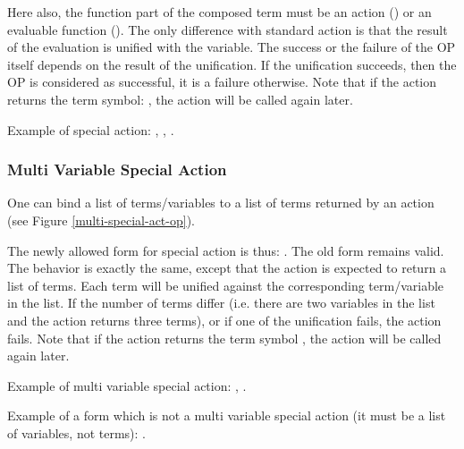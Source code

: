 
Here also, the function part of the composed term must be an action
() or an evaluable function ().  The only difference with standard action is that the result
of the evaluation is unified with the variable. The success or the failure
of the OP itself depends on the result of the unification. If the
unification succeeds, then the OP is considered as successful, it is a
failure otherwise. Note that if the action returns the term symbol:
, the action will be called again later.

Example of special action: , , .

\subsubsection{Multi Variable Special Action}


One can bind a list of terms/variables to a list of
terms returned by an action (see Figure \ref{multi-special-act-op}).

The newly allowed form for special action is thus: \*
.\*
The old form remains valid. The behavior is exactly the same, except that
the action is expected to return a list of terms. Each term will be
unified against the corresponding term/variable in the list. If the number
of terms differ (i.e. there are two variables in the list and the action
returns three terms), or if one of the unification fails, the action
fails. Note that if the action returns the term symbol , the
action will be called again later.

Example of multi variable special action:\*
,\*
.

Example of a form which is not a multi variable special action (it must be a
list of variables, not terms):\*
.


